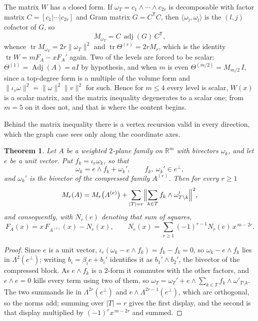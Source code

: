 \documentclass[11pt]{article}
\newtheorem{theorem}{Theorem}
\theoremstyle{remark}
\begin{document}
The matrix $W$ has a closed form. If $\omega_T=c_1\wedge\cdots\wedge c_{2r}$ is
decomposable with factor matrix $C=[c_1|\cdots|c_{2r}]$ and Gram matrix $G=C^{\mathsf T}C$,
then $\langle\omega_{\hat\jmath},\omega_{\hat l}\rangle$ is the $(l,j)$ cofactor of
$G$, so
\begin{equation}\label{eq:Momega}
M_{\omega_T}=C\,\operatorname{adj}(G)\,C^{\mathsf T},
\end{equation}
whence $\operatorname{tr}M_{\omega_T}=2r\|\omega_T\|^2$ and
$\operatorname{tr}\Theta^{(r)}=2rM_r$, which is the identity
$\operatorname{tr}W=mF_A-xF_A'$ again. Two of the levels are forced to be scalar:
$\Theta^{(1)}=\operatorname{Adj}(A)=aI$ by hypothesis, and when $m$ is even
$\Theta^{(m/2)}=M_{m/2}\,I$, since a top-degree form is a multiple of the volume
form and $\|\iota_v\omega\|^2=\|\omega\|^2\|v\|^2$ for such. Hence for $m\le4$ every
level is scalar, $W(x)$ is a scalar matrix, and the matrix inequality degenerates to
a scalar one; from $m=5$ on it does not, and that is where the content begins.

Behind the matrix inequality there is a vertex recursion valid in every direction,
which the graph case sees only along the coordinate axes.

\begin{theorem}\label{thm:vertexrec}
Let $A$ be a weighted $2$-plane family on $\mathbb R^m$ with bivectors $\omega_k$,
and let $e$ be a unit vector. Put $f_k=\iota_e\omega_k$, so that
\[
\omega_k=e\wedge f_k+\omega_k',\qquad
f_k,\ \omega_k'\in e^\perp ,
\]
and $\omega_k'$ is the bivector of the compressed family $A^{(e)}$. Then for every
$r\ge1$
\[
M_r(A)=M_r\bigl(A^{(e)}\bigr)
+\sum_{|T|=r}\Bigl\|\sum_{k\in T}f_k\wedge\omega'_{T\setminus k}\Bigr\|^2 ,
\]
and consequently, with $N_r(e)$ denoting that sum of squares,
\[
F_A(x)=x\,F_{A^{(e)}}(x)-N_e(x),\qquad
N_e(x)=\sum_{r\ge1}(-1)^{r-1}N_r(e)\,x^{\,m-2r}.
\]
\end{theorem}

\begin{proof}
Since $e$ is a unit vector, $\iota_e(\omega_k-e\wedge f_k)=f_k-f_k=0$, so
$\omega_k-e\wedge f_k$ lies in $\Lambda^2(e^\perp)$; writing $b_i=\beta_ie+b_i'$
identifies it as $b_1'\wedge b_2'$, the bivector of the compressed block. As
$e\wedge f_k$ is a $2$-form it commutes with the other factors, and $e\wedge e=0$
kills every term using two of them, so
$\omega_T=\omega_T'+e\wedge\sum_{k\in T}f_k\wedge\omega'_{T\setminus k}$. The two
summands lie in $\Lambda^{2r}(e^\perp)$ and $e\wedge\Lambda^{2r-1}(e^\perp)$, which
are orthogonal, so the norms add; summing over $|T|=r$ gives the first display, and
the second is that display multiplied by $(-1)^rx^{\,m-2r}$ and summed.
\end{proof}
\end{document}
